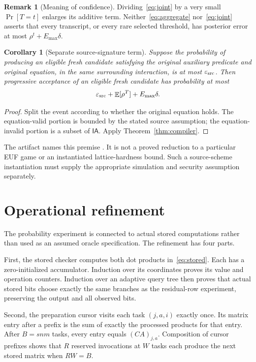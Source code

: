 \documentclass[11pt,letterpaper]{article}
\newtheorem{corollary}[theorem]{Corollary}
\theoremstyle{definition}
\newtheorem{remark}[theorem]{Remark}
\newcommand{\Prb}{\mathop{\mathrm{Pr}}}
\newcommand{\Ex}{\mathop{\mathbb E}}
\newcommand{\Emax}{E_{\max}}
\newcommand{\code}[1]{\texttt{\small\detokenize{#1}}}
\begin{document}
\begin{remark}[Meaning of confidence]
Dividing~\eqref{eq:joint} by a very small $\Prb[T=t]$ enlarges its additive term. Neither~\eqref{eq:aggregate} nor~\eqref{eq:joint} asserts that every transcript, or every rare selected threshold, has posterior error at most $\rho^t+\Emax\delta$.
\end{remark}

\begin{corollary}[Separate source-signature term]
Suppose the probability of producing an eligible fresh candidate satisfying the original auxiliary predicate and original equation, in the same surrounding interaction, is at most $\varepsilon_{\rm src}$. Then progressive acceptance of an eligible fresh candidate has probability at most
\[
 \varepsilon_{\rm src}+\Ex[\rho^T]+\Emax\delta.
\]
\end{corollary}
\begin{proof}
Split the event according to whether the original equation holds. The equation-valid portion is bounded by the stated source assumption; the equation-invalid portion is a subset of $\mathsf{IA}$. Apply Theorem~\ref{thm:compiler}.
\end{proof}
The artifact names this premise \code{OrdinarySourceBound}. It is not a proved reduction to a particular EUF game or an instantiated lattice-hardness bound. Such a source-scheme instantiation must supply the appropriate simulation and security assumption separately.

\section{Operational refinement}
\label{sec:refinement}
The probability experiment is connected to actual stored computations rather than used as an assumed oracle specification. The refinement has four parts.

First, the stored checker computes both dot products in~\eqref{eq:stored}. Each has a zero-initialized accumulator. Induction over its coordinates proves its value and operation counters. Induction over an adaptive query tree then proves that actual stored bits choose exactly the same branches as the residual-row experiment, preserving the output and all observed bits.

Second, the preparation cursor visits each task $(j,a,i)$ exactly once. Its matrix entry after a prefix is the sum of exactly the processed products for that entry. After $B=snm$ tasks, every entry equals $(CA)_{j,a}$. Composition of cursor prefixes shows that $R$ reserved invocations at $W$ tasks each produce the next stored matrix when $RW=B$.
\end{document}
